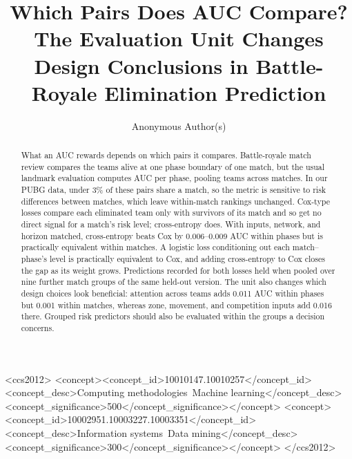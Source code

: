 \documentclass[sigconf,anonymous]{acmart}
\begin{document}
\title{Which Pairs Does AUC Compare? The Evaluation Unit Changes Design Conclusions in Battle-Royale Elimination Prediction}
\renewcommand{\shorttitle}{Which Pairs Does AUC Compare?}

\author{Anonymous Author(s)}

\begin{abstract}
What an AUC rewards depends on which pairs it compares. Battle-royale match review compares the teams alive at one phase boundary of one match, but the usual landmark evaluation computes AUC per phase, pooling teams across matches. In our PUBG data, under 3\% of these pairs share a match, so the metric is sensitive to risk differences between matches, which leave within-match rankings unchanged. Cox-type losses compare each eliminated team only with survivors of its match and so get no direct signal for a match's risk level; cross-entropy does. With inputs, network, and horizon matched, cross-entropy beats Cox by 0.006--0.009 AUC within phases but is practically equivalent within matches. A logistic loss conditioning out each match--phase's level is practically equivalent to Cox, and adding cross-entropy to Cox closes the gap as its weight grows. Predictions recorded for both losses held when pooled over nine further match groups of the same held-out version. The unit also changes which design choices look beneficial: attention across teams adds 0.011 AUC within phases but 0.001 within matches, whereas zone, movement, and competition inputs add 0.016 there. Grouped risk predictors should also be evaluated within the groups a decision concerns.
\end{abstract}
\begin{CCSXML}
<ccs2012>
<concept><concept_id>10010147.10010257</concept_id><concept_desc>Computing methodologies~Machine learning</concept_desc><concept_significance>500</concept_significance></concept>
<concept><concept_id>10002951.10003227.10003351</concept_id><concept_desc>Information systems~Data mining</concept_desc><concept_significance>300</concept_significance></concept>
</ccs2012>
\end{CCSXML}
\maketitle
\end{document}
